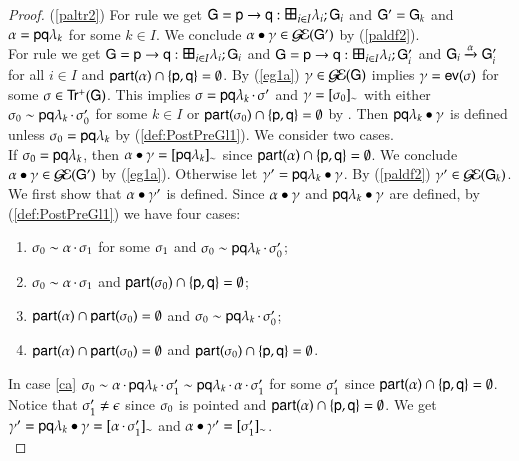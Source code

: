 \begin{proof}
(\ref{paltr2}) For rule  we get $\G=\gt\pp\q i I \la \G$ and ${\sf G}'={\sf G}_k$ and $\alpha={\sf p}{\sf q}\lambda_k$ for some $k\in I$. We conclude ${\alpha}\bullet{\ensuremath{\gamma}}\in \mathcal{G\!E}({\sf G}')$ by (\ref{paldf2}).\\
For rule  we get $\G=\gt\pp\q i I \la \G$ and $\G=\gtp\pp\q i I \la \G$ and ${\sf G}_i\xrightarrow{\alpha} {\sf G}'_i$ for all $i\in I$ and ${\sf part}(\alpha)\cap\{{\sf p},{\sf q}\}=\emptyset$. By (\ref{eg1a}) $\gamma\in\mathcal{G\!E}( {\sf G})$ implies $\gamma={\sf ev}(\sigma)$ for some $\sigma\in{\sf Tr^+}({\sf G})$. This implies $\sigma={\sf p}{\sf q}\lambda_k\,{\cdot}\,\sigma'$ and $\gamma=[\sigma_0]_{\sim}$ 
with either $\sigma_0\sim {\sf p}{\sf q}\lambda_k\,{\cdot}\,\sigma'_0$ for some $k\in I$ or ${\sf part}(\sigma_0)\cap\{{\sf p},{\sf q}\}=\emptyset$ by . Then ${{\sf p}{\sf q}\lambda_k}\bullet{\ensuremath{\gamma}}$ is defined unless $\sigma_0={\sf p}{\sf q}\lambda_k$ by (\ref{def:PostPreGl1}). We consider two cases.\\
If $\sigma_0={\sf p}{\sf q}\lambda_k$, then ${\alpha}\bullet{\ensuremath{\gamma}}=[{\sf p}{\sf q}\lambda_k]_{\sim}$ since ${\sf part}(\alpha)\cap\{{\sf p},{\sf q}\}=\emptyset$. We conclude ${\alpha}\bullet{\ensuremath{\gamma}}\in \mathcal{G\!E}({\sf G}')$ by (\ref{eg1a}). Otherwise let $\gamma'={{\sf p}{\sf q}\lambda_k}\bullet{\ensuremath{\gamma}}$. By (\ref{paldf2}) $\gamma'\in \mathcal{G\!E}({\sf G}_k)$. We first show that ${\alpha}\bullet{\ensuremath{\gamma}'}$ is defined. Since ${\alpha}\bullet{\ensuremath{\gamma}}$ and ${{\sf p}{\sf q}\lambda_k}\bullet{\ensuremath{\gamma}}$ are defined, by (\ref{def:PostPreGl1}) we have four cases:
\begin{enumerate}[label=(\alph*)]%
\item\label{ca} $\sigma_0\sim\alpha\,{\cdot}\,\sigma_1$ for some $\sigma_1$ and $\sigma_0\sim {\sf p}{\sf q}\lambda_k\,{\cdot}\,\sigma'_0$;
\item\label{cb} $\sigma_0\sim\alpha\,{\cdot}\,\sigma_1$ and  ${\sf part}(\sigma_0)\cap\{{\sf p},{\sf q}\}=\emptyset$;
\item\label{cc}  ${\sf part}(\alpha)\cap{\sf part}(\sigma_0)=\emptyset$ and $\sigma_0\sim {\sf p}{\sf q}\lambda_k\,{\cdot}\,\sigma'_0$;
\item\label{cd}  ${\sf part}(\alpha)\cap{\sf part}(\sigma_0)=\emptyset$ and ${\sf part}(\sigma_0)\cap\{{\sf p},{\sf q}\}=\emptyset$.
 \end{enumerate}
 In case \ref{ca} $\sigma_0\sim\alpha\,{\cdot}\,{\sf p}{\sf q}\lambda_k\,{\cdot}\,\sigma'_1\sim {\sf p}{\sf q}\lambda_k\,{\cdot}\,\alpha\,{\cdot}\,\sigma'_1$ for some $\sigma'_1$  since  ${\sf part}(\alpha)\cap\{{\sf p},{\sf q}\}=\emptyset$. Notice that $\sigma'_1\not=\epsilon$ since $\sigma_0$ is pointed and ${\sf part}(\alpha)\cap\{{\sf p},{\sf q}\}=\emptyset$. We get $\gamma'={{\sf p}{\sf q}\lambda_k}\bullet{\ensuremath{\gamma}}=[\alpha\,{\cdot}\,\sigma'_1]_{\sim}$ and ${\alpha}\bullet{\ensuremath{\gamma}'}=[\sigma'_1]_{\sim}$.\\

\end{proof}
